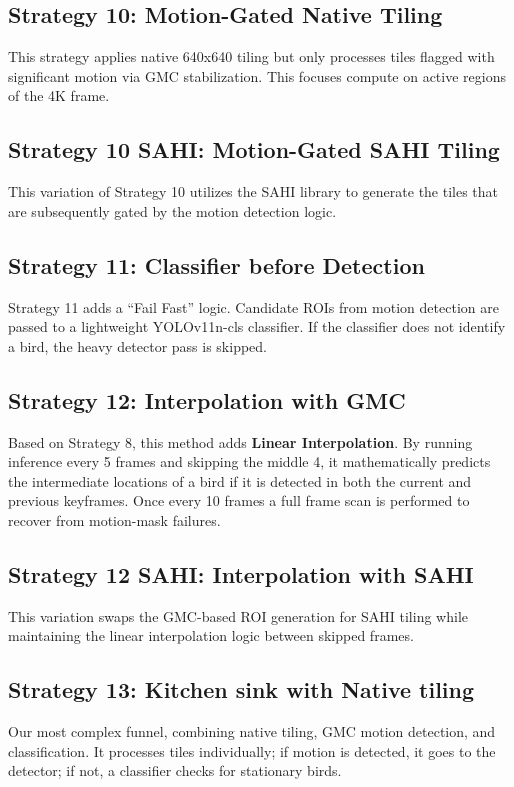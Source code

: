 \documentclass{article}
\begin{document}
\subsection{Strategy 10: Motion-Gated Native Tiling}
This strategy applies native 640x640 tiling but only processes tiles flagged with
significant motion via GMC
stabilization. This focuses compute on active regions of the 4K frame.

\subsection{Strategy 10 SAHI: Motion-Gated SAHI Tiling}
This variation of Strategy 10 utilizes the SAHI library to generate the tiles that are
subsequently gated by
the motion detection logic.

\subsection{Strategy 11: Classifier before Detection}
Strategy 11 adds a ``Fail Fast'' logic. Candidate ROIs from motion detection are passed
to a lightweight
YOLOv11n-cls classifier. If the classifier does not identify a bird, the heavy detector
pass is skipped.

\subsection{Strategy 12: Interpolation with GMC}
Based on Strategy 8, this method adds \textbf{Linear Interpolation}. By running inference
every 5 frames and
skipping the middle 4, it mathematically predicts the intermediate locations of a bird if
it is detected in
both the current and previous keyframes. Once every 10 frames a full frame scan is
performed to recover from
motion-mask failures.

\subsection{Strategy 12 SAHI: Interpolation with SAHI}
This variation swaps the GMC-based ROI generation for SAHI tiling while maintaining the
linear interpolation
logic between skipped frames.

\subsection{Strategy 13: Kitchen sink with Native tiling}
Our most complex funnel, combining native tiling, GMC motion detection, and
classification. It processes
tiles individually; if motion is detected, it goes to the detector; if not, a classifier
checks for stationary birds.
\end{document}
